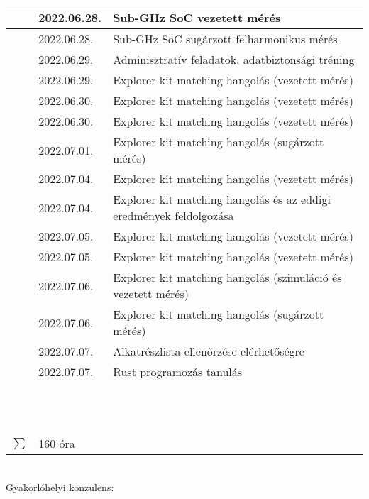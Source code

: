 \documentclass[10pt,a4paper,oneside]{report}
\newcounter{magicrownumbers}
\newcommand\rownum{\stepcounter{magicrownumbers}\arabic{magicrownumbers}}
\begin{document}
\begin{table}[h!]
\begin{tabular}{| c | p{3 cm} | p{10 cm} |}
	\rownum & 2022.06.28. & Sub-GHz SoC vezetett mérés \\ \hline
	\rownum & 2022.06.28. & Sub-GHz SoC sugárzott felharmonikus mérés \\ \hline
	\rownum & 2022.06.29. & Adminisztratív feladatok, adatbiztonsági tréning \\ \hline
	\rownum & 2022.06.29. & Explorer kit matching hangolás (vezetett mérés) \\ \hline
	\rownum & 2022.06.30. & Explorer kit matching hangolás (vezetett mérés) \\ \hline
	\rownum & 2022.06.30. & Explorer kit matching hangolás (vezetett mérés) \\ \hline
	\rownum & 2022.07.01. & Explorer kit matching hangolás (sugárzott mérés) \\ \hline
	\rownum & 2022.07.04. & Explorer kit matching hangolás (vezetett mérés) \\ \hline
	\rownum & 2022.07.04. & Explorer kit matching hangolás és az eddigi eredmények feldolgozása \\ \hline
	\rownum & 2022.07.05. & Explorer kit matching hangolás (vezetett mérés) \\ \hline
	\rownum & 2022.07.05. & Explorer kit matching hangolás (vezetett mérés) \\ \hline
	\rownum & 2022.07.06. & Explorer kit matching hangolás (szimuláció és vezetett mérés) \\ \hline
	\rownum & 2022.07.06. & Explorer kit matching hangolás (sugárzott mérés) \\ \hline
	\rownum & 2022.07.07. & Alkatrészlista ellenőrzése elérhetőségre \\ \hline
	\rownum & 2022.07.07. & Rust programozás tanulás \\ \hline
	\rownum &  &  \\ \hline
	\rownum &  &  \\ \hline
	\rownum &  &  \\ \hline
	\rownum &  &  \\ \hline
	\rownum &  &  \\ \hline
	\rownum &  &  \\ \hline
	\rownum &  &  \\ \hline
	\rownum &  &  \\ \hline
	\rownum &  &  \\ \hline
	\rownum &  &  \\ \hline
	\rownum &  &  \\ \hline
	\rownum &  &  \\ \hline
	$\sum$ & 160 óra& \\ \hline
	\end{tabular}
\end{table}
\vspace{.5 cm} \\
Gyakorlóhelyi konzulens:
\end{document}
